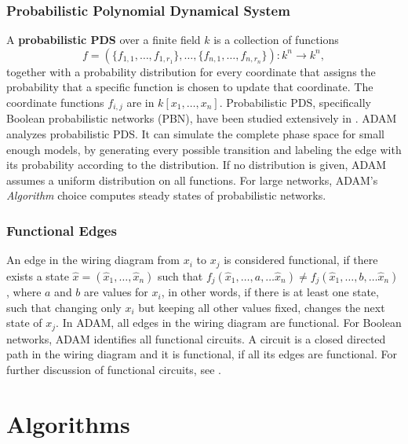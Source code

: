 \documentclass[10pt]{bmc_article}
\begin{document}
\subsubsection{Probabilistic Polynomial Dynamical System}
A {\bf probabilistic PDS} over a finite field $k$ is a collection of functions
$$f = (\{f_{1,1}, \ldots, f_{1, r_1}\}, \ldots, \{f_{n, 1}, \ldots, f_{n, r_n}
\}) : k^n \rightarrow k^n,$$
together with a probability distribution for every coordinate that assigns the
probability that a specific function is chosen to update that coordinate.
The coordinate functions $f_{i,j}$ are in $k[x_1, \ldots , x_n]$.
Probabilistic PDS, specifically Boolean probabilistic networks (PBN), have been studied
extensively in \cite{shmulevich}.
ADAM analyzes probabilistic PDS. It can simulate the
complete phase space for small enough models, by generating every possible
transition and labeling the edge with its probability according to the
distribution. If no distribution is given, ADAM assumes a uniform distribution
on all functions. For large networks, ADAM's {\it Algorithm} choice computes
steady states of probabilistic networks.
\subsubsection{Functional Edges} \label{sec:func}
An edge in the wiring diagram from $x_i$ to $x_j$ is considered
functional, if there exists a state $\hat x = (\hat x_1,  \ldots, \hat x_n)$ such
that $f_j( \hat x_1,  \ldots, a, \ldots \hat x_n) \neq f_j(\hat x_1, \ldots, b, \ldots
\hat x_n)$, where $a$ and $b$ are values for $x_i$, in other words, if there
is at least one state, such that changing only $x_i$ but keeping all other
values fixed, changes the next state of $x_j$.
In ADAM, all edges in the wiring diagram are functional.
For Boolean networks, ADAM identifies all functional circuits. A circuit is a
closed directed path in the wiring diagram and it is functional, if all its
edges are functional. For further discussion of
functional circuits, see \cite{Chaouiya}.
\section{Algorithms}
\end{document}
